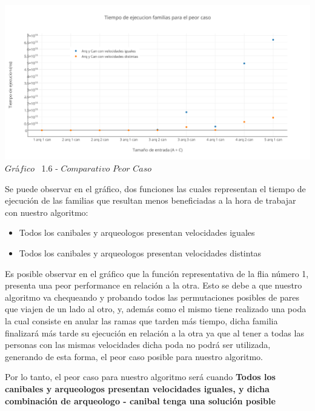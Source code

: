  \vspace*{0.3cm} \vspace*{0.3cm}
  \begin{center}
 \includegraphics[scale=0.65]{./EJ1/comparativopeorcaso.png}
 {$Gr$\'a$fico$ \ 1.6 - $Comparativo$ $Peor$ $Caso$}
  \end{center}
  \vspace*{0.3cm}

Se puede observar en el gr\'afico, dos funciones las cuales representan el tiempo de ejecuci\'on de las familias que resultan menos beneficiadas a la hora de trabajar con nuestro algoritmo:\\
\begin{itemize}
\item Todos los canibales y arqueologos presentan velocidades iguales
\item Todos los canibales y arqueologos presentan velocidades distintas
\end{itemize}

Es posible observar en el gr\'afico que la funci\'on representativa de la flia n\'umero 1, presenta una peor performance en relaci\'on a la otra. Esto se debe a que nuestro algoritmo va chequeando y probando todos las permutaciones posibles de pares que viajen de un lado al otro, y, adem\'as como el mismo tiene realizado una poda la cual consiste en anular las ramas que tarden m\'as tiempo, dicha familia finalizar\'a m\'as tarde su ejecuci\'on en relaci\'on a la otra ya que al tener a todas las personas con las mismas velocidades dicha poda no podr\'a ser utilizada, generando de esta forma, el peor caso posible para nuestro algoritmo.

Por lo tanto, el peor caso para nuestro algoritmo ser\'a cuando \textbf{Todos los canibales y arqueologos presentan velocidades iguales, y dicha combinaci\'on de arqueologo - canibal tenga una soluci\'on posible}


